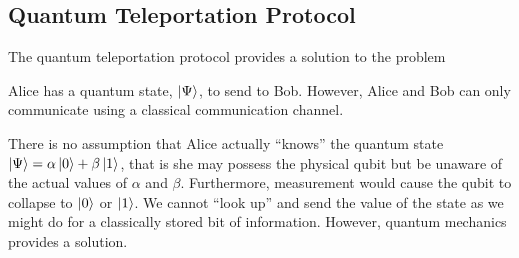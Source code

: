 \subsection{Quantum Teleportation Protocol}
\label{sec:quantteleproto}

The quantum teleportation protocol provides a solution to the problem
\begin{center}
Alice has a quantum state, $\left\vert{\Psi}\right\rangle$, to send to Bob.
However, Alice and Bob can only communicate using a classical communication channel.
\end{center}

There is no assumption that Alice actually ``knows'' the quantum state $\left\vert{\Psi}\right\rangle=\alpha\left\vert{0}\right\rangle+\beta\left\vert{1}\right\rangle$, that is she may possess the physical qubit but be unaware of the actual values of $\alpha$ and $\beta$.
Furthermore, measurement would cause the qubit to collapse to $\left\vert{0}\right\rangle$ or $\left\vert{1}\right\rangle$.
We cannot ``look up'' and send the value of the state as we might do for a classically stored bit of information.
However, quantum mechanics provides a solution.


